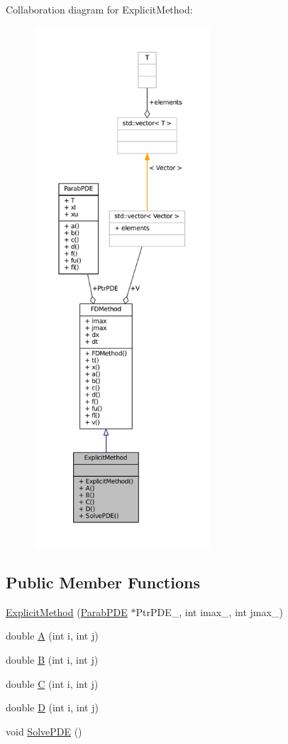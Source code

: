 Collaboration diagram for Explicit\+Method\+:\nopagebreak
\begin{figure}[H]
\begin{center}
\leavevmode
\includegraphics[height=550pt]{classExplicitMethod__coll__graph}
\end{center}
\end{figure}
\subsection*{Public Member Functions}
\begin{DoxyCompactItemize}
\item 
\hyperlink{classExplicitMethod_a49a9754a22eb54753173fc66c4a3d98b}{Explicit\+Method} (\hyperlink{classParabPDE}{Parab\+P\+D\+E} $\ast$Ptr\+P\+D\+E\+\_\+, int imax\+\_\+, int jmax\+\_\+)
\item 
double \hyperlink{classExplicitMethod_a82663c50a40a9877634499d65596e3da}{A} (int i, int j)
\item 
double \hyperlink{classExplicitMethod_a22b9be6bfd28ade5209422a47f6aa9c6}{B} (int i, int j)
\item 
double \hyperlink{classExplicitMethod_a857b126f5aee76df8fedff16ae506e52}{C} (int i, int j)
\item 
double \hyperlink{classExplicitMethod_af3dffe59f3c812828af74b0de39556cd}{D} (int i, int j)
\item 
void \hyperlink{classExplicitMethod_ac2c2d5bac3fc414851c2810ff916c2d6}{Solve\+P\+D\+E} ()
\end{DoxyCompactItemize}
